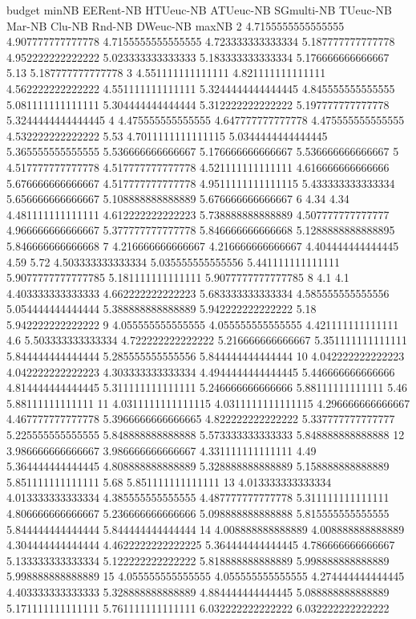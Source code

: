 budget minNB EERent-NB HTUeuc-NB ATUeuc-NB SGmulti-NB TUeuc-NB Mar-NB Clu-NB Rnd-NB DWeuc-NB maxNB
2 4.7155555555555555 4.907777777777778 4.7155555555555555 4.723333333333334 5.187777777777778 4.952222222222222 5.023333333333333 5.183333333333334 5.176666666666667 5.13 5.187777777777778
3 4.551111111111111 4.821111111111111 4.562222222222222 4.551111111111111 5.3244444444444445 4.845555555555555 5.081111111111111 5.304444444444444 5.312222222222222 5.197777777777778 5.3244444444444445
4 4.475555555555555 4.647777777777778 4.475555555555555 4.532222222222222 5.53 4.7011111111111115 5.0344444444444445 5.365555555555555 5.536666666666667 5.176666666666667 5.536666666666667
5 4.517777777777778 4.517777777777778 4.521111111111111 4.616666666666666 5.676666666666667 4.517777777777778 4.9511111111111115 5.433333333333334 5.656666666666667 5.108888888888889 5.676666666666667
6 4.34 4.34 4.481111111111111 4.612222222222223 5.738888888888889 4.507777777777777 4.966666666666667 5.377777777777778 5.846666666666668 5.1288888888888895 5.846666666666668
7 4.216666666666667 4.216666666666667 4.404444444444445 4.59 5.72 4.503333333333334 5.035555555555556 5.441111111111111 5.9077777777777785 5.181111111111111 5.9077777777777785
8 4.1 4.1 4.403333333333333 4.662222222222223 5.683333333333334 4.585555555555556 5.054444444444444 5.388888888888889 5.942222222222222 5.18 5.942222222222222
9 4.055555555555555 4.055555555555555 4.421111111111111 4.6 5.503333333333334 4.722222222222222 5.216666666666667 5.351111111111111 5.844444444444444 5.285555555555556 5.844444444444444
10 4.042222222222223 4.042222222222223 4.303333333333334 4.4944444444444445 5.446666666666666 4.814444444444445 5.311111111111111 5.246666666666666 5.88111111111111 5.46 5.88111111111111
11 4.0311111111111115 4.0311111111111115 4.296666666666667 4.467777777777778 5.3966666666666665 4.822222222222222 5.337777777777777 5.225555555555555 5.848888888888888 5.573333333333333 5.848888888888888
12 3.986666666666667 3.986666666666667 4.331111111111111 4.49 5.364444444444445 4.808888888888889 5.328888888888889 5.158888888888889 5.851111111111111 5.68 5.851111111111111
13 4.013333333333334 4.013333333333334 4.385555555555555 4.487777777777778 5.311111111111111 4.806666666666667 5.236666666666666 5.098888888888888 5.815555555555555 5.844444444444444 5.844444444444444
14 4.008888888888889 4.008888888888889 4.304444444444444 4.4622222222222225 5.364444444444445 4.786666666666667 5.133333333333334 5.122222222222222 5.818888888888889 5.998888888888889 5.998888888888889
15 4.055555555555555 4.055555555555555 4.274444444444445 4.403333333333333 5.328888888888889 4.884444444444445 5.088888888888889 5.171111111111111 5.761111111111111 6.032222222222222 6.032222222222222
